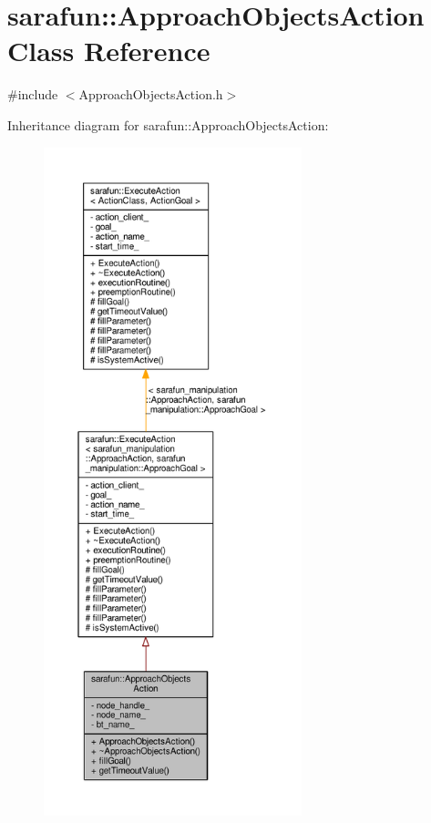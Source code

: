 \hypertarget{classsarafun_1_1ApproachObjectsAction}{\section{sarafun\-:\-:Approach\-Objects\-Action Class Reference}
\label{classsarafun_1_1ApproachObjectsAction}
}


{\ttfamily \#include $<$Approach\-Objects\-Action.\-h$>$}



Inheritance diagram for sarafun\-:\-:Approach\-Objects\-Action\-:\nopagebreak
\begin{figure}[H]
\begin{center}
\leavevmode
\includegraphics[height=550pt]{d0/d16/classsarafun_1_1ApproachObjectsAction__inherit__graph}
\end{center}
\end{figure}


